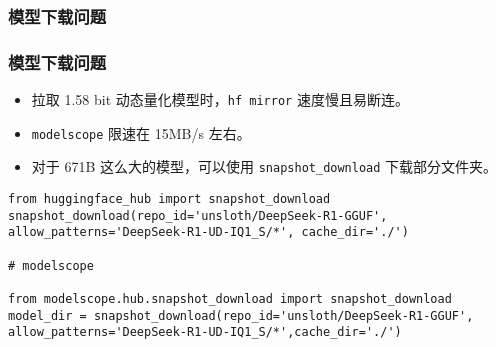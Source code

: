 \begin{frame}[fragile]
\frametitle{模型下载问题}
\subsubsection{模型下载问题}
\begin{itemize}
    \item 拉取 1.58 bit 动态量化模型时，\texttt{hf mirror} 速度慢且易断连。
    \item \texttt{modelscope} 限速在 15MB/s 左右。
    \item 对于 671B 这么大的模型，可以使用 \texttt{snapshot\_download} 下载部分文件夹。
\end{itemize}
\begin{lstlisting}
from huggingface_hub import snapshot_download
snapshot_download(repo_id='unsloth/DeepSeek-R1-GGUF', allow_patterns='DeepSeek-R1-UD-IQ1_S/*', cache_dir='./')

# modelscope

from modelscope.hub.snapshot_download import snapshot_download
model_dir = snapshot_download(repo_id='unsloth/DeepSeek-R1-GGUF', allow_patterns='DeepSeek-R1-UD-IQ1_S/*',cache_dir='./')
\end{lstlisting}
\end{frame}

